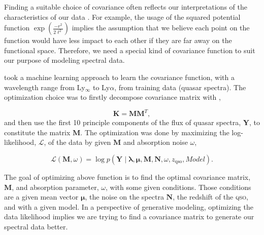 \documentclass{ar-1col}
\begin{document}
Finding a suitable choice of covariance often reflects our interpretations of the characteristics of our data  \citep{Rasmussen2005}. 
For example, the usage of the squared potential function $\exp{(\frac{-r^2}{2 \ell^2})}$ implies the assumption that we believe each point on the function would have less impact to each other if they are far away on the functional space.
Therefore, we need a special kind of covariance function to suit our purpose of modeling spectral data.

\citet{Garnett17} took a machine learning approach to learn the covariance function, with a wavelength range from Ly$_\infty$ to Ly$\alpha$, from training data (quasar spectra). 
The optimization choice was to firstly decompose covariance matrix with \citep{Garnett2015},

\begin{equation}
    \mathbf{K} = \mathbf{M}\mathbf{M}^{T},
    \label{eq:decompose}
\end{equation}
and then use the first 10 principle components of the flux of quasar spectra, $\mathbf{Y}$, to constitute the matrix $\mathbf{M}$. 
The optimization was done by maximizing the log-likelihood, $\mathcal{L}$, of the data by given $\mathbf{M}$ and absorption noise $\omega$, 

\begin{equation}
    \mathcal{L}(\mathbf{M}, \omega) = \log{ p(\mathbf{Y} \mid \mathbf{\lambda}, \mathbf{\mu}, \mathbf{M}, \mathbf{N}, \omega, z_\mathrm{qso}, Model) }.
\end{equation}

The goal of optimizing above function is to find the optimal covariance matrix, $\mathbf{M}$, and absorption parameter, $\omega$, with some given conditions. Those conditions are a given mean vector $\mathbf{\mu}$, the noise on the spectra $\mathbf{N}$, the redshift of the \textsc{qso}, and with a given model. 
In a perspective of generative modeling, optimizing the data likelihood implies we are trying to find a covariance matrix to generate our spectral data better. 
\end{document}
